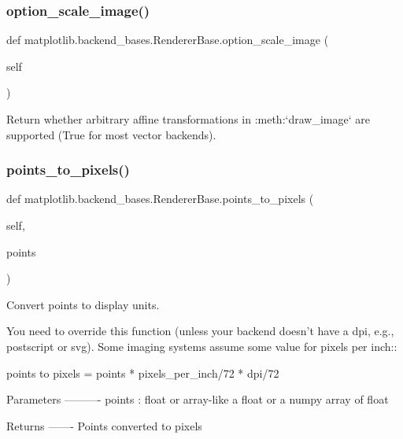 \subsubsection{\texorpdfstring{option\+\_\+scale\+\_\+image()}{option\_scale\_image()}}
{\footnotesize\ttfamily def matplotlib.\+backend\+\_\+bases.\+Renderer\+Base.\+option\+\_\+scale\+\_\+image (\begin{DoxyParamCaption}\item[{}]{self }\end{DoxyParamCaption})}

\begin{DoxyVerb}Return whether arbitrary affine transformations in :meth:`draw_image`
are supported (True for most vector backends).
\end{DoxyVerb}
 \mbox{\label{classmatplotlib_1_1backend__bases_1_1RendererBase_a64e53fbd4a31d6267706d73d83f0ddb6}} 
\subsubsection{\texorpdfstring{points\+\_\+to\+\_\+pixels()}{points\_to\_pixels()}}
{\footnotesize\ttfamily def matplotlib.\+backend\+\_\+bases.\+Renderer\+Base.\+points\+\_\+to\+\_\+pixels (\begin{DoxyParamCaption}\item[{}]{self,  }\item[{}]{points }\end{DoxyParamCaption})}

\begin{DoxyVerb}Convert points to display units.

You need to override this function (unless your backend
doesn't have a dpi, e.g., postscript or svg).  Some imaging
systems assume some value for pixels per inch::

    points to pixels = points * pixels_per_inch/72 * dpi/72

Parameters
----------
points : float or array-like
    a float or a numpy array of float

Returns
-------
Points converted to pixels
\end{DoxyVerb}
 \mbox{\label{classmatplotlib_1_1backend__bases_1_1RendererBase_a3494a42b9937b3ce2366bde08692e8a5}} 
